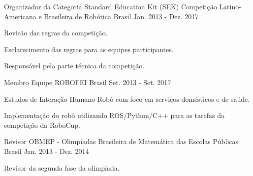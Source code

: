 

\begin{cventries}

  \cventry
    {Organizador da Categoria Standard Education Kit (SEK)} %
    {Competição Latino-Americana e Brasileira de Robótica} %
    {Brasil} %
    {Jan. 2013 - Dez. 2017} %
    {
      \begin{cvitems} %
        \item {Revisão das regras da competição.}
        \item {Esclarecimento das regras para as equipes participantes.}
        \item {Responsável pela parte técnica da competição.}
      \end{cvitems}
    }

  \cventry
    {Membro} %
    {Equipe ROBOFEI} %
    {Brasil} %
    {Set. 2013 - Set. 2017} %
    {
      \begin{cvitems} %
        \item {Estudos de Interação Humano-Robô com foco em serviços domésticos e de saúde.}
        \item {Implementação do robô utilizando ROS/Python/C++ para as tarefas da competição \@home da RoboCup.}
      \end{cvitems}
    }

  \cventry
    {Revisor} %
    {OBMEP - Olimpíadas Brasileira de Matemática das Escolas Públicas} %
    {Brasil} %
    {Jan. 2013 - Dez. 2014} %
    {
      \begin{cvitems} %
        \item {Revisor da segunda fase da olimpíada.}
      \end{cvitems}
    }

\end{cventries}
